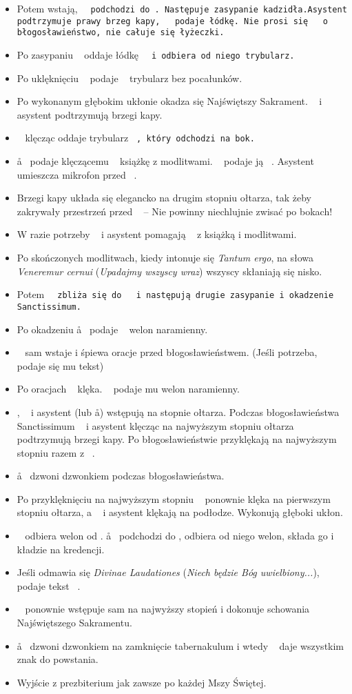 \begin{itemize}
			\item Potem wstają, \tt~ podchodzi do \cc. Następuje zasypanie kadzidła.Asystent podtrzymuje prawy brzeg kapy, \cc~ podaje łódkę. Nie prosi się \ii~ o błogosławieństwo, nie całuje się łyżeczki.
			\item  Po zasypaniu \cc~ oddaje łódkę \tt~ i odbiera od niego trybularz.
			\item Po uklęknięciu \cc~ podaje \ii~ trybularz bez pocałunków.
			\item Po wykonanym głębokim ukłonie okadza się Najświętszy Sakrament. \cc~ i asystent podtrzymują brzegi kapy.
			\item \cc~ klęcząc oddaje trybularz \tt~, który odchodzi na bok.
			\item \aa~ podaje klęczącemu \cc~ książkę z modlitwami. \cc~ podaje ją \ii~. Asystent umieszcza mikrofon przed \ii~.
			\item Brzegi kapy układa się elegancko na drugim stopniu ołtarza, tak żeby zakrywały przestrzeń przed \ii~ – Nie powinny niechlujnie zwisać po bokach!
			\item W razie potrzeby \cc~ i asystent pomagają \ii~ z książką i modlitwami.
			\item Po skończonych modlitwach, kiedy intonuje się \textit{Tantum ergo}, na słowa \textit{Veneremur cernui} (\textit{Upadajmy wszyscy wraz}) wszyscy skłaniają się nisko.
			\item  Potem \tt~ zbliża się do \cc~ i następują drugie zasypanie i okadzenie Sanctissimum.
			\item Po okadzeniu \aa~ podaje \cc~ welon naramienny.
			\item \ii~ sam wstaje i śpiewa oracje przed błogosławieństwem. (Jeśli potrzeba, podaje się mu tekst)
			\item  Po oracjach \ii~ klęka. \cc~ podaje mu welon naramienny.
			\item \ii, \cc~ i asystent (lub \aa) wstępują na stopnie ołtarza. Podczas błogosławieństwa Sanctissimum \cc~ i asystent klęcząc na najwyższym stopniu ołtarza podtrzymują brzegi kapy. Po błogosławieństwie przyklękają na najwyższym stopniu razem z \ii~.
			\item \aa~ dzwoni dzwonkiem podczas błogosławieństwa.
			\item Po przyklęknięciu na najwyższym stopniu \ii~ ponownie klęka na pierwszym stopniu ołtarza, a \cc~ i asystent klękają na podłodze. Wykonują głęboki ukłon.
			\item \cc~ odbiera welon od \ii. \aa~ podchodzi do \cc, odbiera od niego welon, składa go i kładzie na kredencji.
			\item Jeśli odmawia się \textit{Divinae Laudationes} (\textit{Niech będzie Bóg uwielbiony...}), \cc~ podaje tekst \ii~.
			\item \ii~ ponownie wstępuje sam na najwyższy stopień i dokonuje schowania Najświętszego Sakramentu.
			\item \aa~ dzwoni dzwonkiem na zamknięcie tabernakulum i wtedy \cc~ daje wszystkim znak do powstania.
			\item Wyjście z prezbiterium jak zawsze po każdej Mszy Świętej.
		\end{itemize}